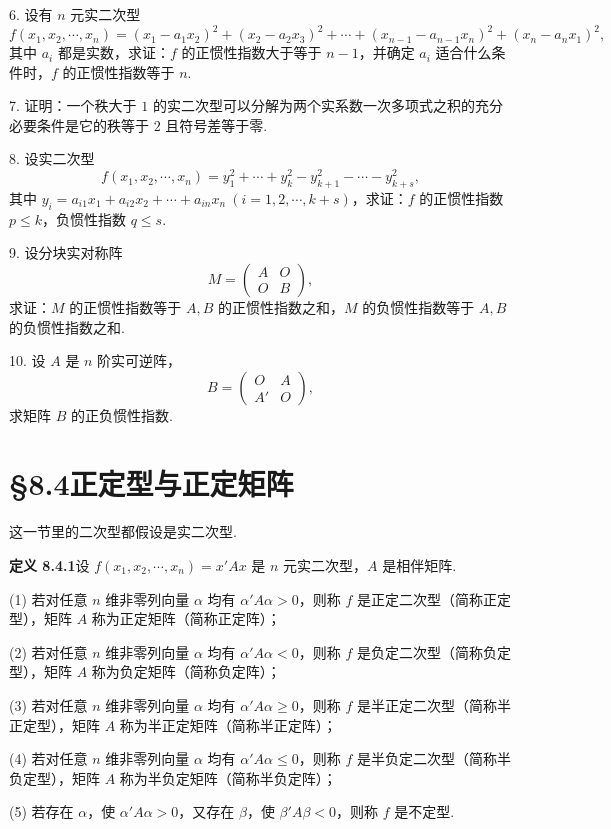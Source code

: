 \documentclass[UTF8,12pt,a4paper,fontset=fandol]{ctexart}
\begin{document}
6. 设有 $n$ 元实二次型
\[
f(x_1,x_2,\cdots,x_n)=(x_1-a_1x_2)^2+(x_2-a_2x_3)^2+\cdots+(x_{n-1}-a_{n-1}x_n)^2+(x_n-a_nx_1)^2,
\]
其中 $a_i$ 都是实数，求证：$f$ 的正惯性指数大于等于 $n-1$，并确定 $a_i$ 适合什么条件时，$f$ 的正惯性指数等于 $n$.

7. 证明：一个秩大于 $1$ 的实二次型可以分解为两个实系数一次多项式之积的充分必要条件是它的秩等于 $2$ 且符号差等于零.

8. 设实二次型
\[
f(x_1,x_2,\cdots,x_n)=y_1^2+\cdots+y_k^2-y_{k+1}^2-\cdots-y_{k+s}^2,
\]
其中 $y_i=a_{i1}x_1+a_{i2}x_2+\cdots+a_{in}x_n\ (i=1,2,\cdots,k+s)$，求证：$f$ 的正惯性指数 $p\leq k$，负惯性指数 $q\leq s$.

9. 设分块实对称阵
\[
M=\left(\begin{array}{cc}A&O\\ O&B\end{array}\right),
\]
求证：$M$ 的正惯性指数等于 $A,B$ 的正惯性指数之和，$M$ 的负惯性指数等于 $A,B$ 的负惯性指数之和.

10. 设 $A$ 是 $n$ 阶实可逆阵，
\[
B=\left(\begin{array}{cc}O&A\\ A'&O\end{array}\right),
\]
求矩阵 $B$ 的正负惯性指数.

\section*{§8.4\quad 正定型与正定矩阵}

这一节里的二次型都假设是实二次型.

\noindent\textbf{定义 8.4.1}\quad 设 $f(x_1,x_2,\cdots,x_n)=x'Ax$ 是 $n$ 元实二次型，$A$ 是相伴矩阵.

(1) 若对任意 $n$ 维非零列向量 $\alpha$ 均有 $\alpha'A\alpha>0$，则称 $f$ 是正定二次型（简称正定型），矩阵 $A$ 称为正定矩阵（简称正定阵）；

(2) 若对任意 $n$ 维非零列向量 $\alpha$ 均有 $\alpha'A\alpha<0$，则称 $f$ 是负定二次型（简称负定型），矩阵 $A$ 称为负定矩阵（简称负定阵）；

(3) 若对任意 $n$ 维非零列向量 $\alpha$ 均有 $\alpha'A\alpha\geq 0$，则称 $f$ 是半正定二次型（简称半正定型），矩阵 $A$ 称为半正定矩阵（简称半正定阵）；

(4) 若对任意 $n$ 维非零列向量 $\alpha$ 均有 $\alpha'A\alpha\leq 0$，则称 $f$ 是半负定二次型（简称半负定型），矩阵 $A$ 称为半负定矩阵（简称半负定阵）；

(5) 若存在 $\alpha$，使 $\alpha'A\alpha>0$，又存在 $\beta$，使 $\beta'A\beta<0$，则称 $f$ 是不定型.
\end{document}
